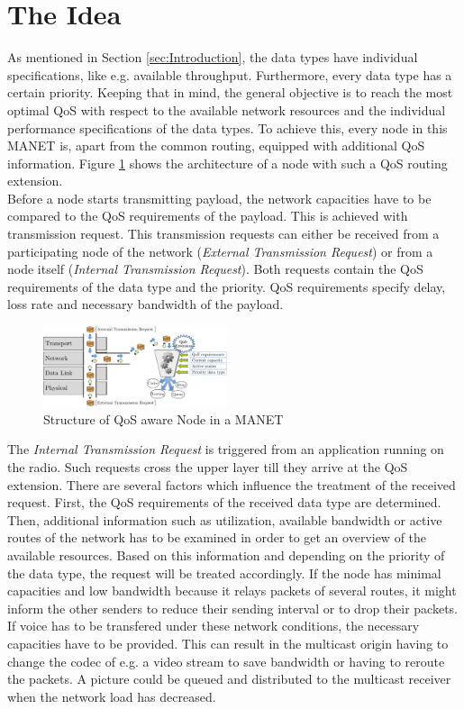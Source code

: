 \documentclass[conference]{IEEEtran}
\newcommand{\MANET}{MANET}
\newcommand{\QOS}{QoS}
\begin{document}
	\section{The Idea}
	As mentioned in Section \ref{sec:Introduction}, the data types have individual specifications, like e.g. available throughput. Furthermore, every data type has a certain priority. Keeping that in mind, the general objective is to reach the most optimal \QOS{} with respect to the available network resources and the individual performance specifications of the data types. To achieve this, every node in this \MANET{} is, apart from the common routing, equipped with additional \QOS{} information. Figure \ref{fig:QoSDecision} shows the architecture of a node with such a \QOS{} routing extension.\\
	Before a node starts transmitting payload, the network capacities have to be compared to the \QOS{} requirements of the payload. This is achieved with transmission request. This transmission requests can either be received from a participating node of the network (\textit{External Transmission Request}) or from a node itself (\textit{Internal Transmission Request}). Both requests contain the \QOS{} requirements of the data type and the priority. \QOS{} requirements specify delay, loss rate and necessary bandwidth of the payload. 
	\begin{figure}[h]
		\centering
		\includegraphics[width=0.48\textwidth]{figures/QoSDecision.pdf}
		\caption{Structure of \QOS{} aware Node in a \MANET{}}
		\label{fig:QoSDecision}
	\end{figure}
	 The \textit{Internal Transmission Request} is triggered from an application running on the radio. Such requests cross the upper layer till they arrive at the \QOS{} extension. There are several factors which influence the treatment of the received request. First, the \QOS{} requirements of the received data type are determined. Then, additional information such as utilization, available bandwidth or active routes of the network has to be examined in order to get an overview of the available resources. Based on this information and depending on the priority of the data type, the request will be treated accordingly. If the node has minimal capacities and low bandwidth because it relays packets of several routes, it might inform the other senders to reduce their sending interval or to drop their packets. If voice has to be transfered under these network conditions, the necessary capacities have to be provided. This can result in the multicast origin having to change the codec of e.g. a video stream to save bandwidth or having to reroute the packets. A picture could be queued and distributed to the multicast receiver when the network load has decreased.\\
\end{document}
